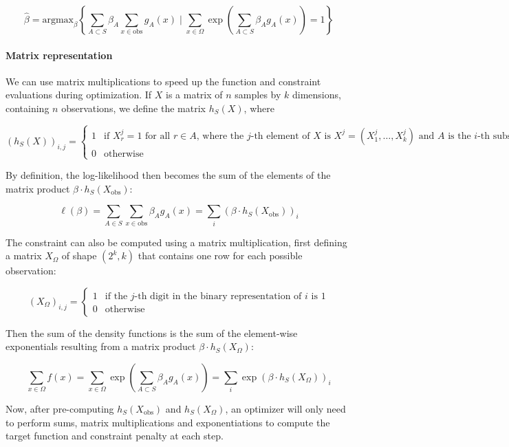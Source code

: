 \[
\hat{\beta} = \text{argmax}_\beta \left\{ \sum_{A \subset S} \beta_A \sum_{x \in \text{obs}} g_A(x) 
\;\Bigg|\;  \sum_{x \in \Omega} \exp \left( \sum_{A \subset S} \beta_A g_A(x) \right) = 1
\right\}
\]

\paragraph{Matrix representation}\label{matrix-representation}

We can use matrix multiplications to speed up the function and
constraint evaluations during optimization. If \(X\) is a matrix of
\(n\) samples by \(k\) dimensions, containing \(n\) observations, we
define the matrix \(h_S(X)\), where

\[ (h_S(X))_{i, j} = \begin{cases}
1 & \text{if } X_{r}^j = 1 \text{ for all } r \in A \text{, where the } j \text{-th element of } X \text{ is } X^j = (X^j_1, \dots, X^j_k) \text{ and } A \text{ is the } i \text{-th subset of } S \\
0 & \text{otherwise}
\end{cases}\]

By definition, the log-likelihood then becomes the sum of the elements
of the matrix product \(\beta \cdot h_S(X_\text{obs})\):

\[ \ell(\beta) = \sum_{A \in S} \sum_{x \in \text{obs}} \beta_A g_A(x) = \sum_i \left( \beta \cdot h_S(X_\text{obs}) \right)_i \]

The constraint can also be computed using a matrix multiplication, first
defining a matrix \(X_\Omega\) of shape \((2^k, k)\) that contains one
row for each possible observation:

\[ (X_\Omega)_{i, j} = \begin{cases}
1 & \text{if the } j \text{-th digit in the binary representation of } i \text{ is } 1 \\
0 & \text{otherwise}
\end{cases}\]

Then the sum of the density functions is the sum of the element-wise
exponentials resulting from a matrix product
\(\beta \cdot h_S(X_\Omega)\):

\[ \sum_{x \in \Omega} f(x) = \sum_{x \in \Omega} \exp \left(\sum_{A \subset S} \beta_A g_A(x) \right) 
= \sum_{i} \exp \left( \beta \cdot h_S(X_\Omega) \right)_i\]

Now, after pre-computing \(h_S(X_\text{obs})\) and \(h_S(X_\Omega)\), an
optimizer will only need to perform sums, matrix multiplications and
exponentiations to compute the target function and constraint penalty at
each step.


